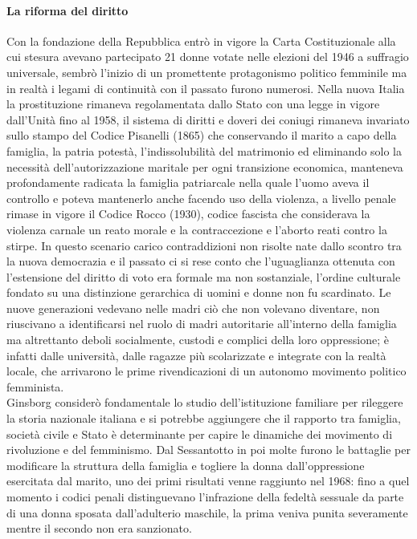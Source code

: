 \paragraph{La riforma del diritto}
Con la fondazione della Repubblica entrò in vigore la Carta Costituzionale alla cui stesura avevano partecipato 21 donne votate nelle elezioni del 1946 a suffragio universale, sembrò l'inizio di un promettente protagonismo politico femminile  ma in realtà i legami di continuità con il passato furono numerosi.
Nella nuova Italia la prostituzione rimaneva regolamentata dallo Stato con una legge in vigore dall'Unità fino al 1958, il sistema di diritti e doveri dei coniugi rimaneva invariato sullo stampo del Codice Pisanelli (1865) che conservando il marito a capo della famiglia, la patria potestà, l'indissolubilità del matrimonio ed eliminando solo la necessità dell'autorizzazione maritale per ogni transizione economica, manteneva profondamente radicata la famiglia patriarcale nella quale l'uomo aveva il controllo e poteva mantenerlo anche facendo uso della violenza, a livello penale rimase in vigore il Codice Rocco (1930), codice fascista che considerava la violenza carnale un reato morale e la contraccezione e l'aborto reati contro la stirpe.
In questo scenario carico contraddizioni non risolte nate dallo scontro tra la nuova democrazia e il passato ci si rese conto che l'uguaglianza ottenuta con l'estensione del diritto di voto era formale ma non sostanziale, l'ordine culturale fondato su una distinzione gerarchica di uomini e donne non fu scardinato.
Le nuove generazioni vedevano nelle madri ciò che non volevano diventare, non riuscivano a identificarsi nel ruolo di madri autoritarie all'interno della famiglia ma altrettanto deboli socialmente, custodi e complici della loro oppressione; è infatti dalle università, dalle ragazze più scolarizzate e integrate con la realtà locale, che arrivarono le prime rivendicazioni di un autonomo movimento politico femminista.
\\Ginsborg considerò fondamentale lo studio dell'istituzione familiare per rileggere la storia nazionale italiana e si potrebbe aggiungere che il rapporto tra famiglia, società civile e Stato è determinante per capire le dinamiche dei movimento di rivoluzione e del femminismo.
Dal Sessantotto in poi molte furono le battaglie per modificare la struttura della famiglia e togliere la donna dall'oppressione esercitata dal marito, uno dei primi risultati venne raggiunto nel 1968: fino a quel momento i codici penali distinguevano l'infrazione della fedeltà sessuale da parte di una donna sposata dall'adulterio maschile, la prima veniva punita severamente mentre il secondo non era sanzionato.
